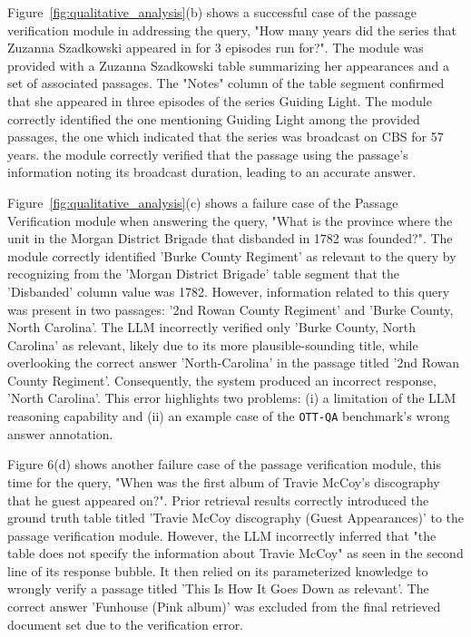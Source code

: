 Figure~\ref{fig:qualitative_analysis}(b) shows a successful case of the passage verification module in addressing the query, "How many years did the series that Zuzanna Szadkowski appeared in for 3 episodes run for?".
The module was provided with a Zuzanna Szadkowski table summarizing her appearances and a set of associated passages. 
The "Notes" column of the table segment confirmed that she appeared in three episodes of the series Guiding Light. 
The module correctly identified the one mentioning Guiding Light among the provided passages, the one which indicated that the series was broadcast on CBS for 57 years. 
the module correctly verified that the passage using the passage's information noting its broadcast duration, leading to an accurate answer.


Figure~\ref{fig:qualitative_analysis}(c) shows a failure case of the Passage Verification module when answering the query, "What is the province where the unit in the Morgan District Brigade that disbanded in 1782 was founded?".
The module correctly identified 'Burke County Regiment' as relevant to the query by recognizing from the 'Morgan District Brigade' table segment that the 'Disbanded' column value was 1782. 
However, information related to this query was present in two passages: '2nd Rowan County Regiment' and 'Burke County, North Carolina'. 
The LLM incorrectly verified only 'Burke County, North Carolina' as relevant, likely due to its more plausible-sounding title, while overlooking the correct answer 'North-Carolina' in the passage titled '2nd Rowan County Regiment'.
Consequently, the system produced an incorrect response, 'North Carolina'.
This error highlights two problems: (i) a limitation of the LLM reasoning capability and (ii) an example case of the \texttt{OTT-QA} benchmark's wrong answer annotation.


Figure 6(d) shows another failure case of the passage verification module, this time for the query, "When was the first album of Travie McCoy's discography that he guest appeared on?".
Prior retrieval results correctly introduced the ground truth table titled 'Travie McCoy discography (Guest Appearances)' to the passage verification module.
However, the LLM incorrectly inferred that "the table does not specify the information about Travie McCoy" as seen in the second line of its response bubble.
It then relied on its parameterized knowledge to wrongly verify a passage titled 'This Is How It Goes Down as relevant'. 
The correct answer 'Funhouse (Pink album)' was excluded from the final retrieved document set due to the verification error.

